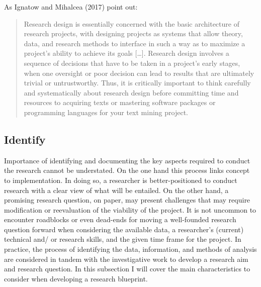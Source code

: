 \documentclass[
  letterpaper,
]{scrbook}
\begin{document}
As Ignatow and Mihalcea (2017) point out:

\begin{quote}
Research design is essentially concerned with the basic architecture of
research projects, with designing projects as systems that allow theory,
data, and research methods to interface in such a way as to maximize a
project's ability to achieve its goals {[}\ldots{]}. Research design
involves a sequence of decisions that have to be taken in a project's
early stages, when one oversight or poor decision can lead to results
that are ultimately trivial or untrustworthy. Thus, it is critically
important to think carefully and systematically about research design
before committing time and resources to acquiring texts or mastering
software packages or programming languages for your text mining project.
\end{quote}

\hypertarget{identify}{%
\subsection{Identify}\label{identify}}

Importance of identifying and documenting the key aspects required to
conduct the research cannot be understated. On the one hand this process
links concept to implementation. In doing so, a researcher is
better-positioned to conduct research with a clear view of what will be
entailed. On the other hand, a promising research question, on paper,
may present challenges that may require modification or reevaluation of
the viability of the project. It is not uncommon to encounter roadblocks
or even dead-ends for moving a well-founded research question forward
when considering the available data, a researcher's (current) technical
and/ or research skills, and the given time frame for the project. In
practice, the process of identifying the data, information, and methods
of analysis are considered in tandem with the investigative work to
develop a research aim and research question. In this subsection I will
cover the main characteristics to consider when developing a research
blueprint.
\end{document}
